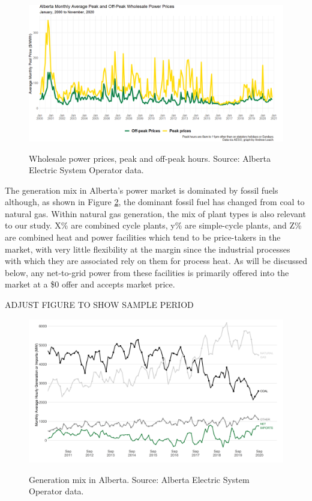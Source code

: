 \documentclass[12pt]{article}
\begin{document}
\begin{figure}[!h]%
	\centering \vspace{-.25cm} \includegraphics[width=6.5in]{images/peak_prices_2000_2020.png}
\label{fig:ab_prices}
\vspace{-0.75cm}	\caption{Wholesale power prices, peak and off-peak hours.  Source: Alberta Electric System Operator data.}
\end{figure}

The generation mix in Alberta's power market is dominated by fossil fuels although, as shown in Figure \ref{fig:gen_mix}, the dominant fossil fuel has changed from coal to natural gas. Within natural gas generation, the mix of plant types is also relevant to our study. X\% are combined cycle plants, y\% are simple-cycle plants, and Z\% are combined heat and power facilities which tend to be price-takers in the market, with very little flexibility at the margin since the industrial processes with which they are associated rely on them for process heat. As will be discussed below, any net-to-grid power from these facilities is primarily offered into the market at a \$0 offer and accepts market price.


ADJUST FIGURE TO SHOW SAMPLE PERIOD


\begin{figure}[!h]%
	\centering \vspace{-.25cm} \includegraphics[width=6.5in]{images/gen_fuel.png}
\label{fig:gen_mix}
\vspace{-0.75cm}	\caption{Generation mix in Alberta.  Source: Alberta Electric System Operator data.}
\end{figure}
\end{document}
